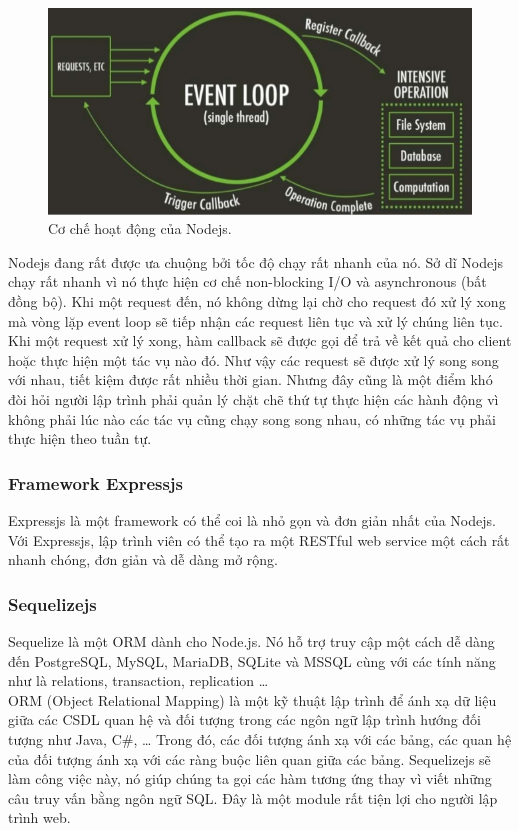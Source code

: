 \documentclass[a4paper,12pt,oneside]{article}
\begin{document}
\begin{figure}[htp]
\centering
\includegraphics[scale=.8]{hinh/nodejs.png}
\caption{Cơ chế hoạt động của Nodejs.}
\end{figure}

Nodejs đang rất được ưa chuộng bởi tốc độ chạy rất nhanh của nó. Sở dĩ Nodejs chạy rất nhanh vì nó thực hiện cơ chế non-blocking I/O và asynchronous (bất đồng bộ). Khi một request đến, nó không dừng lại chờ cho request đó xử lý xong mà vòng lặp event loop sẽ tiếp nhận các request liên tục và xử lý chúng liên tục. Khi một request xử lý xong, hàm callback sẽ được gọi để trả về kết quả cho client hoặc thực hiện một tác vụ nào đó. Như vậy các request sẽ được xử lý song song với nhau, tiết kiệm được rất nhiều thời gian. Nhưng đây cũng là một điểm khó đòi hỏi người lập trình phải quản lý chặt chẽ thứ tự thực hiện các hành động vì không phải lúc nào các tác vụ cũng chạy song song nhau, có những tác vụ phải thực hiện theo tuần tự.
\subsubsection{Framework Expressjs}
\noindent Expressjs là một framework có thể coi là nhỏ gọn và đơn giản nhất của Nodejs. Với Expressjs, lập trình viên có thể tạo ra một RESTful web service một cách rất nhanh chóng, đơn giản và dễ dàng mở rộng.
\subsubsection{Sequelizejs}
\noindent Sequelize là một ORM dành cho Node.js. Nó hỗ trợ truy cập một cách dễ dàng đến PostgreSQL, MySQL, MariaDB, SQLite và MSSQL cùng với các tính năng như là relations, transaction, replication …\\
 ORM (Object Relational Mapping) là một kỹ thuật lập trình để ánh xạ dữ liệu giữa các CSDL quan hệ và đối tượng trong các ngôn ngữ lập trình hướng đối tượng như Java, C\#, … Trong đó, các đối tượng ánh xạ với các bảng, các quan hệ của đối tượng ánh xạ với các ràng buộc liên quan giữa các bảng. Sequelizejs sẽ làm công việc này, nó giúp chúng ta gọi các hàm tương ứng thay vì viết những câu truy vấn bằng ngôn ngữ SQL. Đây là một module rất tiện lợi cho người lập trình web.
\end{document}
